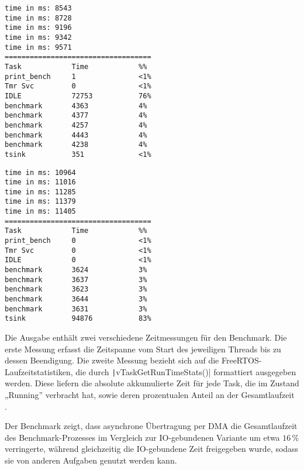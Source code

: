\begin{minipage}[t]{0.5\textwidth}
    \begin{code}
        \begin{verbatim}
time in ms: 8543
time in ms: 8728
time in ms: 9196
time in ms: 9342
time in ms: 9571
===================================
Task            Time            %%
print_bench     1               <1%
Tmr Svc         0               <1%
IDLE            72753           76%
benchmark       4363            4%
benchmark       4377            4%
benchmark       4257            4%
benchmark       4443            4%
benchmark       4238            4%
tsink           351             <1%
    \end{verbatim}
    \end{code}
\end{minipage}
\hfill
\begin{minipage}[t]{0.5\textwidth}
    \begin{code}
        \begin{verbatim}
time in ms: 10964
time in ms: 11016
time in ms: 11285
time in ms: 11379
time in ms: 11405
===================================
Task            Time            %%
print_bench     0               <1%
Tmr Svc         0               <1%
IDLE            0               <1%
benchmark       3624            3%
benchmark       3637            3%
benchmark       3623            3%
benchmark       3644            3%
benchmark       3631            3%
tsink           94876           83%
    \end{verbatim}
    \end{code}
\end{minipage}

Die Ausgabe enthält zwei verschiedene Zeitmessungen für den Benchmark. Die erste
Messung erfasst die Zeitspanne vom Start des jeweiligen Threads bis zu dessen
Beendigung. Die zweite Messung bezieht sich auf die
FreeRTOS-Laufzeitstatistiken, die durch \texttt|vTaskGetRunTimeStats()|
formattiert ausgegeben werden. Diese liefern die absolute akkumulierte Zeit für
jede Task, die im Zustand „Running” verbracht hat, sowie deren prozentualen
Anteil an der Gesamtlaufzeit \cite{freertos_runtime_stats}.

Der Benchmark zeigt, dass asynchrone Übertragung per DMA die Gesamtlaufzeit des
Benchmark-Prozesses im Vergleich zur IO-gebundenen Variante um etwa $16\,\%$
verringerte, während gleichzeitig die IO-gebundene Zeit freigegeben wurde,
sodass sie von anderen Aufgaben genutzt werden kann.

